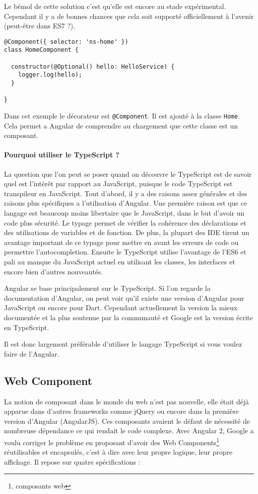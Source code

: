 Le bémol de cette solution c'est qu'elle est encore au stade expérimental\cite{ts:decorator}. Cependant il y a de bonnes chances que cela soit supporté officiellement à l'avenir (peut-être dans ES7 ?).

\begin{lstlisting}[style=htmlcssjs, caption={Exemple de décorateur dans Angular}]
@Component({ selector: 'ns-home' })
class HomeComponent {

  constructor(@Optional() hello: HelloService) {
    logger.log(hello);
  }

} 
\end{lstlisting}
Dans cet exemple le décorateur est \texttt{@Component}. Il est ajouté à la classe \texttt{Home}. Cela permet a Angular de comprendre au chargement que cette classe est un composant.

\paragraph{Pourquoi utiliser le TypeScript ?}
La question que l'on peut se poser quand on découvre le TypeScript est de savoir quel est l'intérêt par rapport au JavaScript, puisque le code TypeScript est transpileur en JavaScript. Tout d'abord, il y a des raisons assez générales et des raisons plus spécifiques a l'utilisation d'Angular. Une première raison est que ce langage est beaucoup moins libertaire que le JavaScript, dans le but d'avoir un code plus sécurité. Le typage permet de vérifier la cohérence des déclarations et des utilisations de variables et de fonction. De plus, la plupart des IDE tirent un avantage important de ce typage pour mettre en avant les erreurs de code ou permettre l'autocompletion. Ensuite le TypeScript utilise l'avantage de l'ES6 et pali au manque du JavaScript actuel en utilisant les classes, les interfaces et encore bien d'autres nouveautés.

Angular se base principalement sur le TypeScript. Si l'on regarde la documentation d'Angular\cite{angular:doc}, on peut voir qu'il existe une version d'Angular pour JavaScript ou encore pour Dart. Cependant actuellement la version la mieux documentée et la plus soutenue par la communauté et Google est la version écrite en TypeScript.

Il est donc largement préférable d'utiliser le langage TypeScript si vous voulez faire de l'Angular.

\subsection{Web Component}
La notion de composant dans le monde du web n'est pas nouvelle, elle était déjà apparue dans d'autres frameworks comme jQuery ou encore dans la première version d'Angular (AngularJS). Ces composants avaient le défaut de nécessité de nombreuse dépendance ce qui rendait le code complexe. Avec Angular 2, Google a voulu corriger le problème en proposant d'avoir des Web Components\footnote{composants web} réutilisables et encapsulés, c'est à dire avec leur propre logique, leur propre affichage. Il repose sur quatre spécifications\cite{ninja:angular} :

